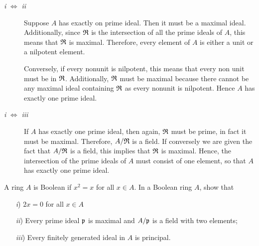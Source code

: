 \documentclass[10pt]{amsart}
\begin{document}
\begin{solution}
    \begin{description}
        \item[\emph{i} $\iff$ \emph{ii}] Suppose $A$ has exactly on prime ideal. Then it must be a maximal ideal. 
        Additionally, since $\mathfrak{R}$ is 
        the intersection of all the prime ideals of $A$, this means that $\mathfrak{R}$ is maximal. 
        Therefore, every element of $A$ is either a unit or a nilpotent element. 

        Conversely, if every nonunit is nilpotent, this means that every non unit must be in $\mathfrak{R}$. 
        Additionally, $\mathfrak{R}$ must be maximal because there cannot be any maximal ideal containing $\mathfrak{R}$ 
        as every nonunit is nilpotent. Hence $A$ has exactly one prime ideal. 

        \item[\emph{i} $\iff$ \emph{iii}]
        If $A$ has exactly one prime ideal, then again, $\mathfrak{R}$ must be prime, in fact it must be maximal. 
        Therefore, $A/\mathfrak{R}$ is a field. If conversely we are given the fact that $A/\mathfrak{R}$ is a field, 
        this implies that $\mathfrak{R}$ is maximal. Hence, the intersection of the prime ideals 
        of $A$ must consist of one element, so that $A$ has exactly one prime ideal.

    \end{description}
\end{solution}

\begin{exercise}
    A ring $A$ is Boolean if $x^2 = x$ for all $x \in A$. In a Boolean ring 
    $A$, show that
    \begin{itemize}
        \item[\emph{i})] $2x = 0$ for all $x \in A$
        \item[\emph{ii})] Every prime ideal $\mathfrak{p}$ is maximal and 
        $A/\mathfrak{p}$ is a field with two elements;
        \item[\emph{iii})] Every finitely generated ideal in $A$ is principal.
    \end{itemize} 
\end{exercise}
\end{document}
